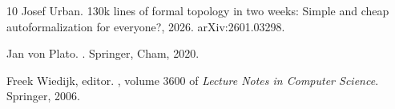 \documentclass[11pt]{article}
\theoremstyle{plain}
\theoremstyle{definition}
\theoremstyle{remark}
\begin{document}
\begin{thebibliography}{10}
Josef Urban.
\newblock 130k lines of formal topology in two weeks: Simple and cheap
  autoformalization for everyone?, 2026.
\newblock arXiv:2601.03298.

Jan von Plato.
.
\newblock Springer, Cham, 2020.

Freek Wiedijk, editor.
,
  volume 3600 of {\em Lecture Notes in Computer Science}.
\newblock Springer, 2006.

\end{thebibliography}
\end{document}
